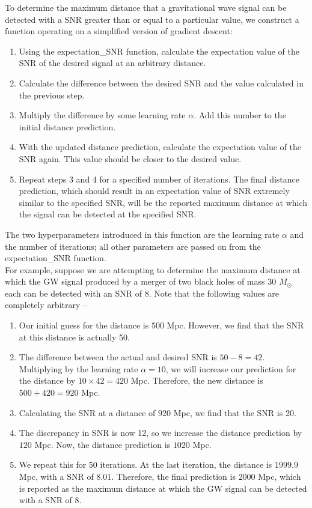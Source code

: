 \documentclass{article}
\begin{document}
To determine the maximum distance that a gravitational wave signal can be detected with a SNR greater than or equal to a particular value, we construct a function operating on a simplified version of gradient descent: 
\begin{enumerate}
    \item Using the expectation\_SNR function, calculate the expectation value of the SNR of the desired signal at an arbitrary distance. 
    \item Calculate the difference between the desired SNR and the value calculated in the previous step. 
    \item Multiply the difference by some learning rate $\alpha$. Add this number to the initial distance prediction. 
    \item With the updated distance prediction, calculate the expectation value of the SNR again. This value should be closer to the desired value. 
    \item Repeat steps 3 and 4 for a specified number of iterations. The final distance prediction, which should result in an expectation value of SNR extremely similar to the specified SNR, will be the reported maximum distance at which the signal can be detected at the specified SNR. 
\end{enumerate}
The two hyperparameters introduced in this function are the learning rate $\alpha$ and the number of iterations; all other parameters are passed on from the expectation\_SNR function. \\

For example, suppose we are attempting to determine the maximum distance at which the GW signal produced by a merger of two black holes of mass 30 $M_\odot$ each can be detected with an SNR of 8. Note that the following values are completely arbitrary -- 
\begin{enumerate}
    \item Our initial guess for the distance is $500$ Mpc. However, we find that the SNR at this distance is actually 50. 
    \item The difference between the actual and desired SNR is $50 - 8 = 42$. Multiplying by the learning rate $\alpha = 10$, we will increase our prediction for the distance by $10 \times 42 = 420$ Mpc. Therefore, the new distance is $500 + 420 = 920$ Mpc. 
    \item Calculating the SNR at a distance of $920$ Mpc, we find that the SNR is 20. 
    \item The discrepancy in SNR is now 12, so we increase the distance prediction by $120$ Mpc. Now, the distance prediction is $1020$ Mpc. 
    \item We repeat this for 50 iterations. At the last iteration, the distance is $1999.9$ Mpc, with a SNR of $8.01$. Therefore, the final prediction is $2000$ Mpc, which is reported as the maximum distance at which the GW signal can be detected with a SNR of $8$. 
\end{enumerate}
\end{document}
